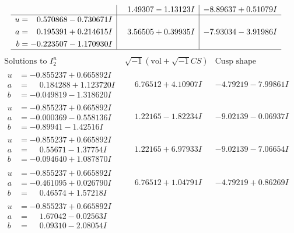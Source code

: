 \documentclass[1p]{elsarticle_modified}
\theoremstyle{definition}
\newcommand{\I}{\sqrt{-1}}
\begin{document}
$$\begin{array}{c|c|c}
 & \phantom{-}1.49307 - 1.13123 I & -8.89637 + 0.51079 I \\ \hline\begin{aligned}
u &= \phantom{-}0.570868 - 0.730671 I \\
a &= \phantom{-}0.195391 + 0.214615 I \\
b &= -0.223507 - 1.170930 I\end{aligned}
 & \phantom{-}3.56505 + 0.39935 I & -7.93034 - 3.91986 I\\
 \hline 
 \end{array}$$\newpage$$\begin{array}{c|c|c}  
\text{Solutions to }I^u_{2}& \I (\text{vol} + \sqrt{-1}CS) & \text{Cusp shape}\\
 \hline 
\begin{aligned}
u &= -0.855237 + 0.665892 I \\
a &= \phantom{-}0.184288 + 1.123720 I \\
b &= -0.049819 - 1.318620 I\end{aligned}
 & \phantom{-}6.76512 + 4.10907 I & -4.79219 - 7.99861 I \\ \hline\begin{aligned}
u &= -0.855237 + 0.665892 I \\
a &= -0.000369 - 0.558136 I \\
b &= -0.89941 - 1.42516 I\end{aligned}
 & \phantom{-}1.22165 - 1.82234 I & -9.02139 - 0.06937 I \\ \hline\begin{aligned}
u &= -0.855237 + 0.665892 I \\
a &= \phantom{-}0.55671 - 1.37754 I \\
b &= -0.094640 + 1.087870 I\end{aligned}
 & \phantom{-}1.22165 + 6.97933 I & -9.02139 - 7.06654 I \\ \hline\begin{aligned}
u &= -0.855237 + 0.665892 I \\
a &= -0.461095 + 0.026790 I \\
b &= \phantom{-}0.46574 + 1.57218 I\end{aligned}
 & \phantom{-}6.76512 + 1.04791 I & -4.79219 + 0.86269 I \\ \hline\begin{aligned}
u &= -0.855237 + 0.665892 I \\
a &= \phantom{-}1.67042 - 0.02563 I \\
b &= \phantom{-}0.09310 - 2.08054 I\end{aligned}

\end{array}$$
\end{document}

